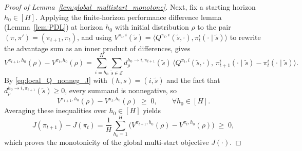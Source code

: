 \documentclass[11pt]{article}
\begin{document}
\begin{proof}[Proof of Lemma~\ref{lem:global_multistart_monotone}]
Next, fix a starting horizon $h_0\in[H]$. Applying the finite-horizon performance difference lemma (Lemma~\ref{lem:PDL}) at horizon $h_0$ with initial distribution $\rho$ to the pair $(\pi,\pi')=(\pi_{t+1},\pi_t)$, and using $V^{\pi_t,i}(\tilde s)=\langle Q^{\pi_t,i}(\tilde s,\cdot),\pi_t^i(\cdot\mid\tilde s)\rangle$ to rewrite the advantage sum as an inner product of differences, gives
\[
V^{\pi_{t+1},h_0}(\rho)-V^{\pi_t,h_0}(\rho)
=
\sum_{i=h_0}^H\sum_{\tilde s\in\mathcal S}
d^{h_0\to i,\pi_{t+1}}_\rho(\tilde s)\,
\big\langle Q^{\pi_t,i}(\tilde s,\cdot),\,\pi_{t+1}^i(\cdot\mid\tilde s)-\pi_t^i(\cdot\mid\tilde s)\big\rangle.
\]
By \eqref{eq:local_Q_nonneg_J} with $(h,s)=(i,\tilde s)$ and the fact that
$d^{h_0\to i,\pi_{t+1}}_\rho(\tilde s)\ge 0$, every summand is nonnegative, so
\[
V^{\pi_{t+1},h_0}(\rho)-V^{\pi_t,h_0}(\rho)\;\ge\;0,
\qquad \forall h_0\in[H].
\]
Averaging these inequalities over $h_0\in[H]$ yields
\[
J(\pi_{t+1})-J(\pi_t)
=
\frac{1}{H}\sum_{h_0=1}^H\Big(V^{\pi_{t+1},h_0}(\rho)-V^{\pi_t,h_0}(\rho)\Big)
\;\ge\;0,
\]
which proves the monotonicity of the global multi-start objective $J(\cdot)$.
\end{proof}
\end{document}
